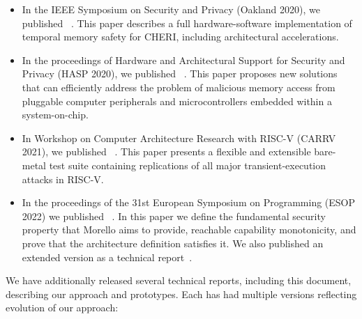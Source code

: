 \begin{itemize}
\item In the IEEE Symposium on Security and Privacy (Oakland 2020), we
  published ~\cite{cornucopia}.
  This paper describes a full hardware-software implementation of temporal
  memory safety for CHERI, including architectural accelerations.

\item In the proceedings of Hardware and Architectural Support for Security
  and Privacy (HASP 2020), we published ~\cite{DBLP:conf/micro/MarkettosBBNMW20}.
  This paper proposes new solutions that can efficiently address the problem
  of malicious memory access from pluggable computer peripherals and
  microcontrollers embedded within a system-on-chip.

\item In Workshop on Computer Architecture Research with RISC-V (CARRV 2021),
  we published ~\cite{fuchs2021framework}.
  This paper presents a flexible and extensible bare-metal test suite containing replications of all major transient-execution attacks in RISC-V.

\item In the proceedings of the 31st European Symposium on Programming
  (ESOP 2022) we published ~\cite{DBLP:conf/esop/BauereissCSAESB22}.
  In this paper we define the fundamental security property that Morello aims
  to provide, reachable capability monotonicity, and prove that the
  architecture definition satisfies it.  We also published an extended
  version as a technical report~\cite{UCAM-CL-TR-959}.
\end{itemize}

We have additionally released several technical reports, including this
document, describing our approach and prototypes.
Each has had multiple versions reflecting evolution of our approach:

